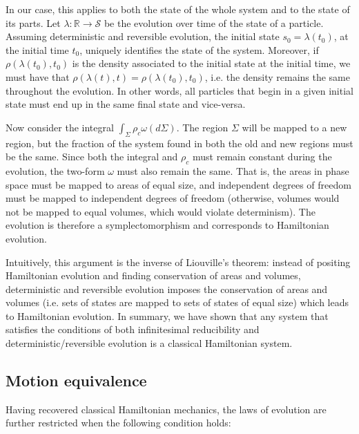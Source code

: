 \documentclass[letterpaper]{article}
\begin{document}
In our case, this applies to both the state of the whole system and to the state of its parts. Let $\lambda: \mathbb{R} \to \mathcal{S}$ be the evolution over time of the state of a particle. Assuming deterministic and reversible evolution, the initial state $s_0 = \lambda(t_0)$, at the initial time $t_0$, uniquely identifies the state of the system. Moreover, if $\rho(\lambda(t_0), t_0)$ is the density associated to the initial state at the initial time, we must have that $\rho(\lambda(t), t) = \rho(\lambda(t_0), t_0)$, i.e. the density remains the same throughout the evolution. In other words, all particles that begin in a given initial state must end up in the same final state and vice-versa.  

Now consider the integral $\int_{\Sigma} \rho_c \omega(d\Sigma)$. The region $\Sigma$ will be mapped to a new region, but the fraction of the system found in both the old and new regions must be the same. Since both the integral and $\rho_c$ must remain constant during the evolution, the two-form $\omega$ must also remain the same. That is, the areas in phase space must be mapped to areas of equal size, and independent degrees of freedom must be mapped to independent degrees of freedom (otherwise, volumes would not be mapped to equal volumes, which would violate determinism). The evolution is therefore a symplectomorphism and corresponds to Hamiltonian evolution. 

Intuitively, this argument is the inverse of Liouville's theorem: instead of positing Hamiltonian evolution and finding conservation of areas and volumes, deterministic and reversible evolution imposes the conservation of areas and volumes (i.e. sets of states are mapped to sets of states of equal size) which leads to Hamiltonian evolution. In summary, we have shown that any system that satisfies the conditions of both infinitesimal reducibility and deterministic/reversible evolution is a classical Hamiltonian system.


\subsection{Motion equivalence}
\label{motion}

Having recovered classical Hamiltonian mechanics, the laws of evolution are further restricted when the following condition holds:
\end{document}
